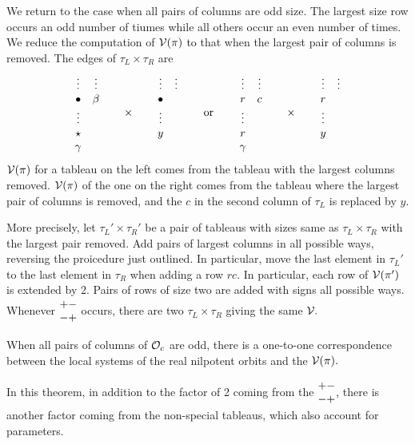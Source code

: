 \documentclass[11pt ,reqno]{amsart}
\begin{document}
\subsubsection{} We return to the case when all pairs of columns are odd size.
The largest size row occurs an odd number of tiumes while all others
occur an even number of times. We reduce the computation of ${\mathcal V}(\pi)$
to that when the largest pair of columns is removed. The edges of 
$\tau_L\times\tau_R$ are
$$
\begin{matrix}
  \vdots &\vdots\\
  \bullet &\beta\\
  \vdots &      \\
  \star &\\
  \gamma\\
\end{matrix}
  \qquad\times\qquad
\begin{matrix}
  \vdots &\vdots\\
  \bullet &\\
  \vdots &      \\
  y&\\
  &
\end{matrix}
\qquad\text{ or }\qquad
\begin{matrix}
  \vdots &\vdots\\
  r&c\\
  \vdots &      \\
  r&\\
  \gamma\\
\end{matrix}
  \qquad\times\qquad
\begin{matrix}
  \vdots &\vdots\\
  r &\\
  \vdots &      \\
  y&\\
  &
\end{matrix}
$$
${\mathcal V}(\pi)$ for a tableau on the left comes from the tableau with the
largest columns removed. ${\mathcal V}(\pi)$ of the  one on the right comes from
the tableau where the largest pair of columns is removed, and the $c$
in the second column of $\tau_L$ is replaced by $y.$ 

More precisely, let $\tau_L'\times \tau_R'$ be a pair of tableaus with
sizes same as $\tau_L\times\tau_R$ with the largest pair removed. Add
pairs of largest columns in all possible ways, reversing the
proicedure just outlined. In particular, move the last element
in $\tau_L'$ to the last element in $\tau_R$ when adding a row
$rc$. In particular, each row of ${\mathcal V}(\pi')$ is extended by 2. Pairs
of rows of size two are added with signs all possible ways. Whenever
$\begin{matrix} +-\\-+\end{matrix}$ occurs, there are two $\tau_L\times\tau_R$  giving the same
${\mathcal V}.$  
\begin{theorem}
When all pairs of columns of $\mathcal O_c$ are odd, there is a one-to-one
correspondence between the local systems of the real nilpotent orbits
and the ${\mathcal V}(\pi).$

In this theorem, in addition to the factor of 2 coming from the $\begin{matrix}
+-\\-+\end{matrix}$, there is another factor coming from the non-special
tableaus, which also account for parameters.
\end{theorem}
 
\end{document}
